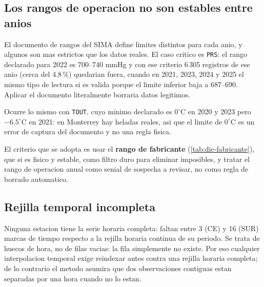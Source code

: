 \subsection{Los rangos de operacion no son estables entre anios}\label{sec:dic:rangos}

El documento de rangos del SIMA define limites distintos para cada anio, y
algunos son mas estrictos que los datos reales. El caso critico es
\texttt{PRS}: el rango declarado para 2022 es 700--740 mmHg y con ese criterio
6\,305 registros de ese anio (cerca del 4.8\,\%) quedarian fuera, cuando en
2021, 2023, 2024 y 2025 el mismo tipo de lectura si es valida porque el limite
inferior baja a 687--690. Aplicar el documento literalmente borraria datos
legitimos.

Ocurre lo mismo con \texttt{TOUT}, cuyo minimo declarado es $0^{\circ}$C en
2020 y 2023 pero $-6.5^{\circ}$C en 2021: en Monterrey hay heladas reales, asi
que el limite de $0^{\circ}$C es un error de captura del documento y no una
regla fisica.

El criterio que se adopta es usar el \textbf{rango de fabricante}
(\cref{tab:dic-fabricante}), que si es fisico y estable, como filtro duro para
eliminar imposibles, y tratar el rango de operacion anual como senial de
sospecha a revisar, no como regla de borrado automatico.

\subsection{Rejilla temporal incompleta}\label{sec:dic:rejilla}

Ninguna estacion tiene la serie horaria completa: faltan entre 3 (CE) y 16
(SUR) marcas de tiempo respecto a la rejilla horaria continua de su periodo. Se
trata de huecos de hora, no de filas vacias: la fila simplemente no existe. Por
eso cualquier interpolacion temporal exige reindexar antes contra una rejilla
horaria completa; de lo contrario el metodo asumira que dos observaciones
contiguas estan separadas por una hora cuando no lo estan.

